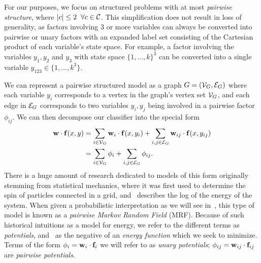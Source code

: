 For our purposes, we focus on structured problems with at most {\em pairwise 
structure}, where $|c| \leq 2\;\; \forall c \in \mathcal{C}$.  This simplification does 
not result in loss of generality, as factors involving 3 or more variables can 
always be converted into pairwise or unary factors with an expanded label set 
consisting of the Cartesian product of each variable's state space. For 
example, a factor involving the variables $y_1,y_2$ and $y_3$ with state space 
$\{1,\ldots,k\}^3$ can be converted into a single variable $y_{123} \in 
\{1,\ldots,k^3\}$.

We can represent a pairwise structured model as a graph $G = (\mathcal{V}_G,\mathcal{E}_G)$ where each variable $y_i$ corresponds to a vertex in the graph's vertex set $\mathcal{V}_G$, and each edge in $\mathcal{E}_G$ corresponds to two variables $y_i,y_j$ being involved in a pairwise factor $\phi_{ij}$.  We can then decompose our classifier into the special form
\begin{align}
\mathbf{w} \cdot \mathbf{f}(x,y) &= \sum_{i \in \mathcal{V}_G} \mathbf{w}_i \cdot \mathbf{f}(x,y_i) + \sum_{i,j \in 
\mathcal{E}_G} \mathbf{w}_{ij} \cdot \mathbf{f}(x,y_{ij}) \\
& = \sum_{i \in \mathcal{V}_G} \phi_i + \sum_{i,j \in \mathcal{E}_G} \phi_{ij}.
\label{eq:mrf}
\end{align} There is a huge amount of research dedicated to models of this form 
originally stemming from statistical mechanics, where it was first used to 
determine the spin of particles connected in a grid, and~ describes 
the log of the energy of the system.  When given a probabilistic interpretation 
as we will see in~, this type of model is known as a {\em 
pairwise Markov Random Field} (MRF).  Because of such historical intuitions as 
a model for energy, we refer to the different terms as {\em potentials}, 
and~ as the negative of an {\em energy function} which we seek to 
minimize.  Terms of the form $\phi_i = \mathbf{w}_i \cdot \mathbf{f}_i$ we will refer to as 
{\em unary potentials}; $\phi_{ij} = \mathbf{w}_{ij} \cdot \mathbf{f}_{ij}$ are {\em pairwise 
potentials}.

